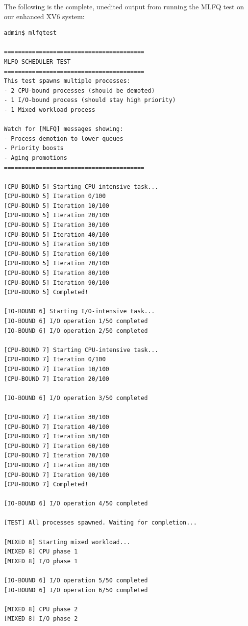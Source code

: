 \documentclass[a4paper,12pt]{report}
\begin{document}
The following is the complete, unedited output from running the MLFQ test on our enhanced XV6 system:

\begin{tcolorbox}[colback=black!5, colframe=green!60, title=\textbf{Live XV6 MLFQ Test Execution}]
\begin{lstlisting}[basicstyle=\ttfamily\tiny, breaklines=true, backgroundcolor=\color{black!5}]
admin$ mlfqtest

========================================
MLFQ SCHEDULER TEST
========================================
This test spawns multiple processes:
- 2 CPU-bound processes (should be demoted)
- 1 I/O-bound process (should stay high priority)  
- 1 Mixed workload process

Watch for [MLFQ] messages showing:
- Process demotion to lower queues
- Priority boosts
- Aging promotions
========================================

[CPU-BOUND 5] Starting CPU-intensive task...
[CPU-BOUND 5] Iteration 0/100
[CPU-BOUND 5] Iteration 10/100
[CPU-BOUND 5] Iteration 20/100
[CPU-BOUND 5] Iteration 30/100
[CPU-BOUND 5] Iteration 40/100
[CPU-BOUND 5] Iteration 50/100
[CPU-BOUND 5] Iteration 60/100
[CPU-BOUND 5] Iteration 70/100
[CPU-BOUND 5] Iteration 80/100
[CPU-BOUND 5] Iteration 90/100
[CPU-BOUND 5] Completed!

[IO-BOUND 6] Starting I/O-intensive task...
[IO-BOUND 6] I/O operation 1/50 completed
[IO-BOUND 6] I/O operation 2/50 completed

[CPU-BOUND 7] Starting CPU-intensive task...
[CPU-BOUND 7] Iteration 0/100
[CPU-BOUND 7] Iteration 10/100
[CPU-BOUND 7] Iteration 20/100

[IO-BOUND 6] I/O operation 3/50 completed

[CPU-BOUND 7] Iteration 30/100
[CPU-BOUND 7] Iteration 40/100
[CPU-BOUND 7] Iteration 50/100
[CPU-BOUND 7] Iteration 60/100
[CPU-BOUND 7] Iteration 70/100
[CPU-BOUND 7] Iteration 80/100
[CPU-BOUND 7] Iteration 90/100
[CPU-BOUND 7] Completed!

[IO-BOUND 6] I/O operation 4/50 completed

[TEST] All processes spawned. Waiting for completion...

[MIXED 8] Starting mixed workload...
[MIXED 8] CPU phase 1
[MIXED 8] I/O phase 1

[IO-BOUND 6] I/O operation 5/50 completed
[IO-BOUND 6] I/O operation 6/50 completed

[MIXED 8] CPU phase 2
[MIXED 8] I/O phase 2


\end{lstlisting}
\end{tcolorbox}
\end{document}
